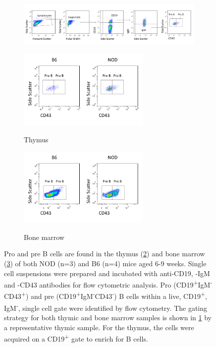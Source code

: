 \begin{figure}	
	\begin{subfigure}{\textwidth}
	\caption{}
	\includegraphics[width=\textwidth]{Figures/ProPreGating.pdf}
	\label{subfig:ProPreGating}
	\end{subfigure}
	\begin{subfigure}{\textwidth}
	\centering
	\caption{Thymus}
	\includegraphics[width=0.7\textwidth]{Figures/Thymuspropre.png}
	\label{subfig:Thypropre}
	\end{subfigure}
	\begin{subfigure}{\textwidth}
	\centering
	\caption{Bone marrow}
	\includegraphics[width=0.7\textwidth]{Figures/Bonemarrowpropre.png}
	\label{subfig:BMpropre}
	\end{subfigure}
\caption[Pro and pre B cells are present in NOD and B6 mouse thymi]{Pro and pre B cells are found in the thymus (\ref{subfig:Thypropre}) and bone marrow (\ref{subfig:BMpropre}) of both NOD (n=3) and B6 (n=4) mice aged 6-9 weeks. Single cell suspensions were prepared and incubated with anti-CD19, -IgM and -CD43 antibodies for flow cytometric analysis. 
Pro (CD19\textsuperscript{+}IgM\textsuperscript{-}CD43\textsuperscript{+}) and pre (CD19\textsuperscript{+}IgM\textsuperscript{-}CD43\textsuperscript{-}) B cells within a live, CD19\textsuperscript{+}, IgM\textsuperscript{-}, single cell gate were identified by flow cytometry. The gating strategy for both thymic and bone marrow samples is shown in \ref{subfig:ProPreGating} by a representative thymic sample.
For the thymus, the cells were acquired on a CD19\textsuperscript{+} gate to enrich for B cells.}
\label{fig:PropreBcells}
\end{figure}





